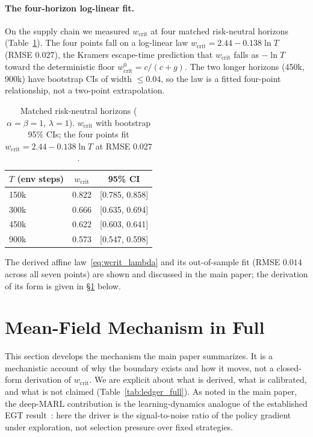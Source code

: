 \documentclass[letterpaper]{article} %
\theoremstyle{plain}
\newcommand{\wcrit}{w_{\mathrm{crit}}}
\begin{document}
\paragraph{The four-horizon log-linear fit.}
On the supply chain we measured $\wcrit$ at four matched risk-neutral horizons
(Table~\ref{tab:horizons}). The four points fall on a log-linear law $\wcrit=2.44-0.138\ln T$
(RMSE $0.027$), the Kramers escape-time prediction that $\wcrit$ falls as $-\ln T$ toward the
deterministic floor $\wcrit^0=c/(c+g)$. The two longer horizons (450k, 900k) have bootstrap CIs of
width ${\le}0.04$, so the law is a fitted four-point relationship, not a two-point extrapolation.

\begin{table}[t]
\centering \small
\caption{Matched risk-neutral horizons ($\alpha{=}\beta{=}1$, $\lambda{=}1$). $\wcrit$ with
bootstrap 95\% CIs; the four points fit $\wcrit=2.44-0.138\ln T$ at RMSE $0.027$.}
\label{tab:horizons}
\begin{tabular}{lcc}
\toprule
$T$ (env steps) & $\wcrit$ & 95\% CI \\
\midrule
150k & 0.822 & [0.785, 0.858] \\
300k & 0.666 & [0.635, 0.694] \\
450k & 0.622 & [0.603, 0.641] \\
900k & 0.573 & [0.547, 0.598] \\
\bottomrule
\end{tabular}
\end{table}

\medskip\noindent The derived affine law~\eqref{eq:wcrit_lambda} and its out-of-sample fit
(RMSE $0.014$ across all seven points) are shown and discussed in the main paper; the
derivation of its form is given in \S\ref{sec:s_mechanism} below.

\section{Mean-Field Mechanism in Full}
\label{sec:s_mechanism}

This section develops the mechanism the main paper summarizes. It is a mechanistic account of
why the boundary exists and how it moves, not a closed-form derivation of $\wcrit$. We are
explicit about what is derived, what is calibrated, and what is not claimed (Table~\ref{tab:ledger_full}).
As noted in the main paper, the deep-MARL contribution is the learning-dynamics analogue of
the established EGT result~\citep{mengesha2025}: here the driver is the signal-to-noise ratio
of the policy gradient under exploration, not selection pressure over fixed strategies.
\end{document}
